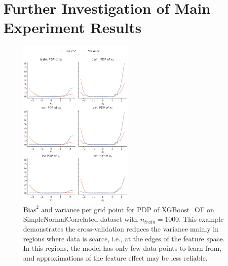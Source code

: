 \documentclass[runningheads]{llncs}
\begin{document}
\clearpage
\section{Further Investigation of Main Experiment Results}\label{app:main-study-further-investigation}

\begin{figure}
    \centering
    \includegraphics[width=0.5\textwidth]{img/further_investigation/snc_pdp_XGBoost_OF_1000.png}
    \caption{$\text{Bias}^2$ and variance per grid point for PDP of XGBoost\_OF on SimpleNormalCorrelated dataset with $n_{train} = 1000$.
    This example demonstrates the cross-validation reduces the variance mainly in regions where data is scarce, i.e.,
    at the edges of the feature space. In this regions, the model has only few data points to learn from, and approximations
    of the feature effect may be less reliable.}
    \label{fig:further-pdp-xgb-snc}  %
\end{figure}
\end{document}
